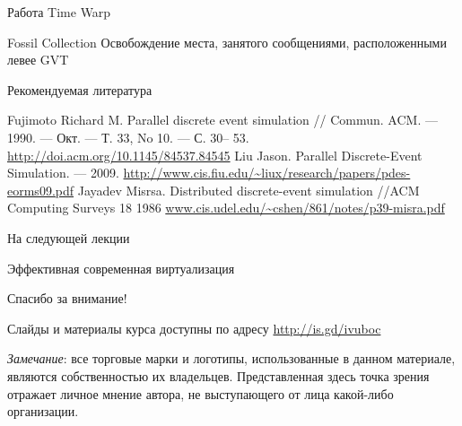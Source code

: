\documentclass{beamer}
\begin{document}
\begin{frame}{Работа Time Warp}
\centering
 
\end{frame}

\begin{frame}{Fossil Collection}
Освобождение места, занятого сообщениями, расположенными левее GVT
\end{frame}

\begin{frame}{}

\end{frame}

% 


\begin{frame}[allowframebreaks]{Рекомендуемая литература}
\begin{thebibliography}{99}
 Fujimoto Richard M. Parallel discrete event simulation // Commun. ACM. — 1990. — Окт. — Т. 33, No 10. — С. 30– 53. \url{http://doi.acm.org/10.1145/84537.84545}
 Liu Jason. Parallel Discrete-Event Simulation. — 2009. \url{http://www.cis.fiu.edu/~liux/research/papers/pdes-eorms09.pdf}
Jayadev Misrsa. Distributed discrete-event simulation //ACM Computing Surveys 18 1986 \url{www.cis.udel.edu/~cshen/861/notes/p39-misra.pdf}


\end{thebibliography}
\end{frame}


\begin{frame}{На следующей лекции}
\centering

Эффективная современная виртуализация

\end{frame}


\begin{frame}

{\huge{Спасибо за внимание!}\par}

\vfill

Слайды и материалы курса доступны по адресу \url{http://is.gd/ivuboc} %

\vfill

\tiny{\textit{Замечание}: все торговые марки и логотипы, использованные в данном материале, являются собственностью их владельцев. Представленная здесь точка зрения отражает личное мнение автора, не выступающего от лица какой-либо организации.}

\end{frame}
\end{document}

